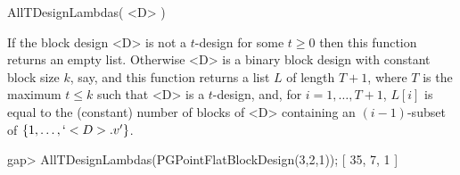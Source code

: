 \>AllTDesignLambdas( <D> )

If the block design <D> is not a $t$-design for some $t\ge 0$ then this
function returns an empty list. Otherwise <D> is a binary block design
with constant block size $k$, say, and this function returns a list
$L$ of length $T+1$, where $T$ is the maximum $t\le k$ such that <D>
is a $t$-design, and, for $i=1,\ldots,T+1$, $L[i]$ is equal to the
(constant) number of blocks of <D> containing an $(i-1)$-subset of
$\{1,\ldots,`<D>.v'\}$.

\beginexample
gap> AllTDesignLambdas(PGPointFlatBlockDesign(3,2,1));                  
[ 35, 7, 1 ]
\endexample


